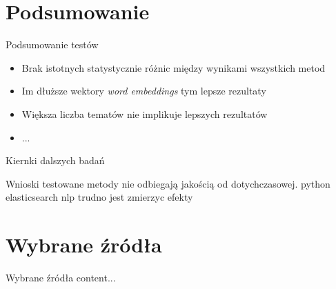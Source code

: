 \documentclass{beamer}
\begin{document}
	\section{Podsumowanie}
	\begin{frame}{Podsumowanie testów}
		\begin{itemize}
			\item Brak istotnych statystycznie różnic między wynikami wszystkich metod \pause
			\item Im dłuższe wektory \emph{word embeddings} tym lepsze rezultaty \pause
			\item Większa liczba tematów nie implikuje lepszych rezultatów \pause
			\item ...
		\end{itemize}
	\end{frame}
	\begin{frame}{Kiernki dalszych badań}
		
	\end{frame}
	\begin{frame}{Wnioski}
		testowane metody nie odbiegają jakością od dotychczasowej.
		python
		elasticsearch
		nlp
		trudno jest zmierzyc efekty
	\end{frame}
	\section{Wybrane źródła}
	\begin{frame}{Wybrane źródła}
		content...
	\end{frame}
\end{document}
